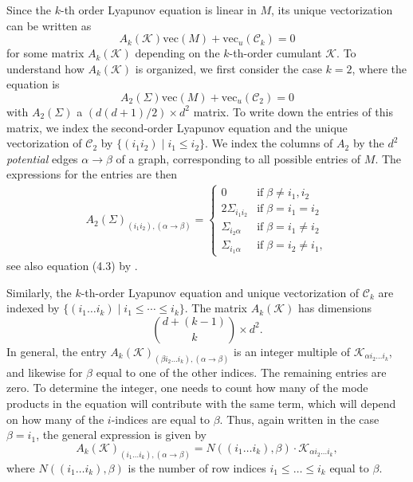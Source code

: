 \documentclass{biometrika}
\begin{document}
Since the $k$-th order Lyapunov equation is linear in $M$, its unique vectorization can be written as 
\begin{equation}
    \label{eq::VecThirdOrder}
    A_k(\mathcal{K} ) \mathrm{vec}(M) + \mathrm{vec}_u(\mathcal{C}_k) = 0
\end{equation}
for some matrix $A_k(\mathcal{K} )$ depending on the $k$-th-order cumulant $\mathcal{K} $. 
To understand how $A_k(\mathcal{K})$ is organized, we first consider 
the case $k = 2$, where the equation is 
\begin{equation}
    \label{eq::VecSecondOrder}
    A_2(\Sigma) \mathrm{vec}(M) + \mathrm{vec}_u(\mathcal{C}_2) = 0
\end{equation}
with $A_2(\Sigma)$ a $(d(d+1)/2) \times d^2$ matrix. To write down the entries of 
this matrix, we index the second-order Lyapunov equation and 
the unique vectorization of $\mathcal{C}_2$ by $\{(i_1i _2) \; | \; i_1 \leq i_2 \}$. 
We index the columns of $A_2$ by the $d^2$ \emph{potential} edges $\alpha \rightarrow \beta$ of
a graph, corresponding to all possible entries of $M$. 
The expressions for the entries are then 
\begin{align}
\label{eq::A2SigmaEntries}
    A_2(\Sigma)_{(i_1 i_2), (\alpha \rightarrow \beta)} = \begin{cases}
        0 & \mathrm{ if } \; \beta  \neq i_1, i_2\\
        2 \Sigma_{i_1 i_2} & \mathrm{ if } \; \beta = i_1 = i_2\\
        \Sigma_{i_2 \alpha} & \mathrm{ if } \; \beta = i_1 \neq i_2\\
        \Sigma_{i_1 \alpha } & \mathrm{ if } \; \beta = i_2 \neq i_1, 
    \end{cases}
\end{align}
see also equation (4.3) by \cite{Dettling:2023}.

Similarly, the $k$-th-order Lyapunov equation and unique vectorization of $\mathcal{C}_k$ are indexed by $\{(i_1 \dots i_k) \; | \; i_1 \leq \cdots \leq i_k \}$. The matrix $A_k(\mathcal{K} )$ has dimensions 
$$
    \binom{d+(k-1)}{k} \times d^2.
$$
In general, the entry  
$A_k(\mathcal{K} )_{(\beta i_2 \dots i_k), (\alpha \rightarrow \beta)}$ is an integer multiple of $\mathcal{K} _{\alpha i_2 \dots i_k}$, and likewise for $\beta$ equal to one of the other indices. The remaining entries 
are zero. 
To determine the integer, one needs to count how many of the mode products in the equation 
will contribute with the same term, which will depend on how many of the $i$-indices are equal to $\beta$. Thus, again written in the case $\beta = i_1$, the general expression is given by
\begin{equation} \label{eq::generalAmatrixentry}
    A_k(\mathcal{K} )_{(i_1 \dots i_k), (\alpha \rightarrow \beta)} = N((i_1 \dots i_k), \beta) \cdot \mathcal{K} _{\alpha i_2 \dots i_k},
\end{equation}
where $N((i_1 \dots i_k), \beta)$ is the number of row indices $i_1 \leq \ldots \leq i_k$
equal to $\beta$. 
\end{document}

